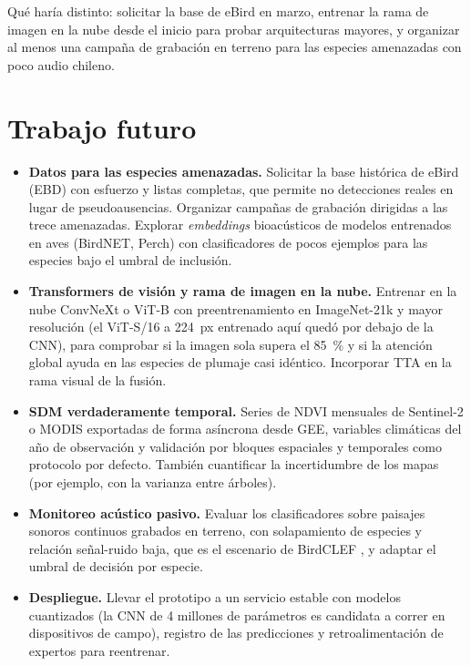 Qué haría distinto: solicitar la base de eBird en marzo, entrenar la rama de
imagen en la nube desde el inicio para probar arquitecturas mayores, y
organizar al menos una campaña de grabación en terreno para las especies
amenazadas con poco audio chileno.

\section{Trabajo futuro}\label{sec:futuro}

\begin{itemize}[leftmargin=*, itemsep=3pt]
  \item \textbf{Datos para las especies amenazadas.} Solicitar la base
        histórica de eBird (EBD) con esfuerzo y listas completas, que permite
        no detecciones reales en lugar de pseudoausencias. Organizar campañas
        de grabación dirigidas a las trece amenazadas. Explorar
        \textit{embeddings} bioacústicos de modelos entrenados en aves
        (BirdNET, Perch) con clasificadores de pocos ejemplos
        \citep{ghani2023embeddings} para las especies bajo el umbral de
        inclusión.
  \item \textbf{Transformers de visión y rama de imagen en la nube.} Entrenar
        en la nube ConvNeXt o ViT-B con preentrenamiento en ImageNet-21k y
        mayor resolución (el ViT-S/16 a \SI{224}{px} entrenado aquí quedó por
        debajo de la CNN), para comprobar si la imagen sola supera el
        \SI{85}{\percent} y si la atención global ayuda en las especies de
        plumaje casi idéntico. Incorporar TTA en la
        rama visual de la fusión.
  \item \textbf{SDM verdaderamente temporal.} Series de NDVI mensuales de
        Sentinel-2 o MODIS exportadas de forma asíncrona desde GEE, variables
        climáticas del año de observación y validación por bloques espaciales
        y temporales como protocolo por defecto. También cuantificar la
        incertidumbre de los mapas (por ejemplo, con la varianza entre árboles).
  \item \textbf{Monitoreo acústico pasivo.} Evaluar los clasificadores sobre
        paisajes sonoros continuos grabados en terreno, con solapamiento de
        especies y relación señal-ruido baja, que es el escenario de BirdCLEF
        \citep{kahl2023birdclef}, y adaptar el umbral de decisión por especie.
  \item \textbf{Despliegue.} Llevar el prototipo a un servicio estable con
        modelos cuantizados (la CNN de 4 millones de parámetros es candidata a
        correr en dispositivos de campo), registro de las predicciones y
        retroalimentación de expertos para reentrenar.
\end{itemize}

